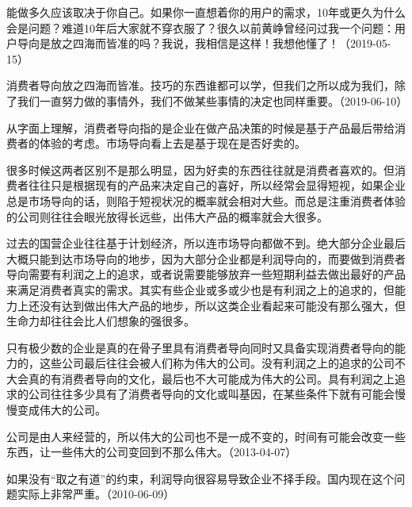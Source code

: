 能做多久应该取决于你自己。如果你一直想着你的用户的需求，10年或更久为什么会是问题？难道10年后大家就不穿衣服了？很久以前黄峥曾经问过我一个问题：用户导向是放之四海而皆准的吗？我说，我相信是这样！我想他懂了！（2019-05-15）


消费者导向放之四海而皆准。技巧的东西谁都可以学，但我们之所以成为我们，除了我们一直努力做的事情外，我们不做某些事情的决定也同样重要。（2019-06-10）


从字面上理解，消费者导向指的是企业在做产品决策的时候是基于产品最后带给消费者的体验的考虑。市场导向看上去是基于现在是否好卖的。

很多时候这两者区别不是那么明显，因为好卖的东西往往就是消费者喜欢的。但消费者往往只是根据现有的产品来决定自己的喜好，所以经常会显得短视，如果企业总是市场导向的话，则陷于短视状况的概率就会相对大些。而总是注重消费者体验的公司则往往会眼光放得长远些，出伟大产品的概率就会大很多。

过去的国营企业往往基于计划经济，所以连市场导向都做不到。绝大部分企业最后大概只能到达市场导向的地步，因为大部分企业都是利润导向的，而要做到消费者导向需要有利润之上的追求，或者说需要能够放弃一些短期利益去做出最好的产品来满足消费者真实的需求。其实有些企业或多或少也是有利润之上的追求的，但能力上还没有达到做出伟大产品的地步，所以这类企业看起来可能没有那么强大，但生命力却往往会比人们想象的强很多。

只有极少数的企业是真的在骨子里具有消费者导向同时又具备实现消费者导向的能力的，这些公司最后往往会被人们称为伟大的公司。没有利润之上的追求的公司不大会真的有消费者导向的文化，最后也不大可能成为伟大的公司。具有利润之上追求的公司往往多少具有了消费者导向的文化或叫基因，在某些条件下就有可能会慢慢变成伟大的公司。

公司是由人来经营的，所以伟大的公司也不是一成不变的，时间有可能会改变一些东西，让一些伟大的公司变回到不那么伟大。（2013-04-07）


如果没有“取之有道”的约束，利润导向很容易导致企业不择手段。国内现在这个问题实际上非常严重。（2010-06-09）

